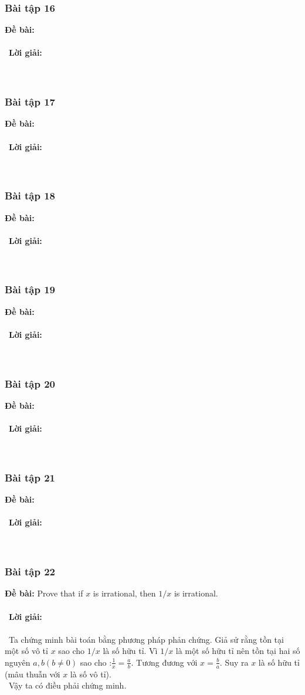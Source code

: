 \documentclass[a4paper]{article}
\begin{document}
\subsubsection{Bài tập 16}
\textbf{Đề bài:} 
\\\ \\\
\textbf{Lời giải:} \\\ \\\
\clearpage
\subsubsection{Bài tập 17}
\textbf{Đề bài:} 
\\\ \\\
\textbf{Lời giải:} \\\ \\\
\clearpage
\subsubsection{Bài tập 18}
\textbf{Đề bài:} 
\\\ \\\
\textbf{Lời giải:} \\\ \\\
\clearpage
\subsubsection{Bài tập 19}
\textbf{Đề bài:} 
\\\ \\\
\textbf{Lời giải:} \\\ \\\
\clearpage
\subsubsection{Bài tập 20}
\textbf{Đề bài:} 
\\\ \\\
\textbf{Lời giải:} \\\ \\\
\clearpage
\subsubsection{Bài tập 21}
\textbf{Đề bài:} 
\\\ \\\
\textbf{Lời giải:} \\\ \\\
\clearpage
\subsubsection{Bài tập 22}
\textbf{Đề bài: }Prove that if $x$ is irrational, then $1/x$ is irrational. \\\ \\\
\textbf{Lời giải:} \\\ \\\
Ta chứng minh bài toán bằng phương pháp phản chứng. Giả sử rằng tồn tại một số vô tỉ $x$ sao cho $1/x$ là số hữu tỉ. Vì $1/x$ là một số hữu tỉ nên tồn tại hai số nguyên $a,b (b \neq 0)$ sao cho :$\frac{1}{x} = \frac{a}{b}.$ Tương đương với $x = \frac{b}{a}$. Suy ra $x$ là số hữu tỉ (mâu thuẫn với $x$ là số vô tỉ). \\\
Vậy ta có điều phải chứng minh.
\clearpage
\end{document}
